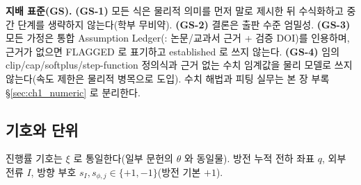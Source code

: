 \begin{groundingbox}
\textbf{지배 표준(GS).} \textbf{(GS-1)} 모든 식은 물리적 의미를 먼저 말로 제시한 뒤 수식화하고 중간
단계를 생략하지 않는다(학부 무비약). \textbf{(GS-2)} 결론은 출판 수준 엄밀성. \textbf{(GS-3)} 모든 가정은
통합 Assumption Ledger(\AL{\#}: 논문/교과서 근거 + 검증 DOI)를 인용하며, 근거가 없으면 FLAGGED 로
표기하고 established 로 쓰지 않는다. \textbf{(GS-4)} 임의 clip/cap/softplus/step-function 정의식과 근거
없는 수치 임계값을 물리 모델로 쓰지 않는다(속도 제한은 물리적 병목으로 도입). 수치 해법과 피팅 실무는
본 장 부록 \S\ref{sec:ch1_numeric} 로 분리한다.
\end{groundingbox}

\subsection{기호와 단위}\label{sec:notation}
진행률 기호는 $\xi$ 로 통일한다(일부 문헌의 $\theta$ 와 동일물). 방전 누적 전하 좌표 $q$, 외부 전류 $I$,
방향 부호 $s_I,s_{\phi,j}\in\{+1,-1\}$(방전 기본 $+1$).
